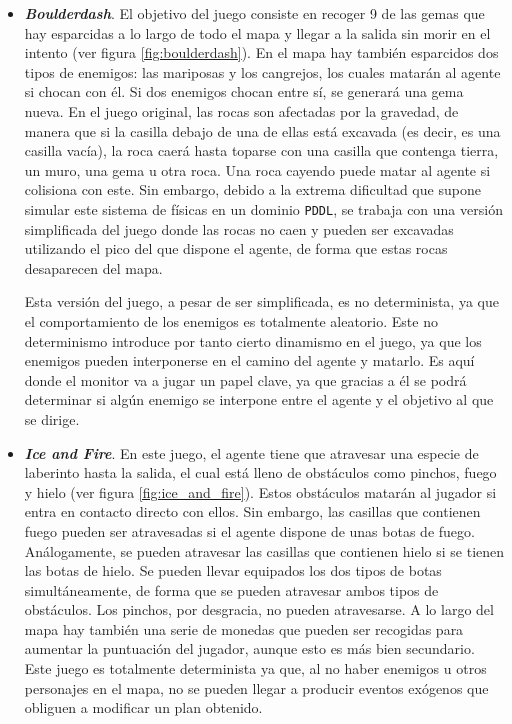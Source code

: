\begin{itemize}[label=\textbullet]
    \item \textbf{\textit{Boulderdash}}. El objetivo del juego consiste en recoger 9 de
    las gemas que hay esparcidas a lo largo de todo el mapa y llegar a la salida
    sin morir en el intento (ver figura \ref{fig:boulderdash}). En el mapa hay también
    esparcidos dos tipos de enemigos: las mariposas y los cangrejos, los cuales matarán al agente
    si chocan con él. Si dos enemigos chocan entre sí, se generará una gema nueva. En el
    juego original, las rocas son afectadas por la gravedad, de manera que si la casilla debajo de una
    de ellas está excavada (es decir, es una casilla vacía), la roca caerá hasta toparse
    con una casilla que contenga tierra, un muro, una gema u otra roca. Una roca cayendo puede matar
    al agente si colisiona con este. Sin embargo, debido a la extrema dificultad que supone
    simular este sistema de físicas en un dominio \texttt{PDDL}, se trabaja con una versión
    simplificada del juego donde las rocas no caen y pueden ser excavadas utilizando el pico
    del que dispone el agente, de forma que estas rocas desaparecen del mapa.
    
    Esta versión del juego, a pesar de ser simplificada, es no determinista, ya que el
    comportamiento de los enemigos es totalmente aleatorio. Este no determinismo introduce
    por tanto cierto dinamismo en el juego, ya que los enemigos pueden interponerse en el
    camino del agente y matarlo. Es aquí donde el monitor va a jugar un papel clave,
    ya que gracias a él se podrá determinar si algún enemigo se interpone entre el agente
    y el objetivo al que se dirige.
    
    \item \textbf{\textit{Ice and Fire}}. En este juego, el agente tiene que atravesar una especie
    de laberinto hasta la salida, el cual está lleno de obstáculos como pinchos, fuego y hielo
    (ver figura \ref{fig:ice_and_fire}). Estos obstáculos matarán al jugador si entra en contacto
    directo con ellos. Sin embargo, las casillas que contienen fuego pueden ser atravesadas si el
    agente dispone de unas botas de fuego. Análogamente, se pueden atravesar las casillas que
    contienen hielo si se tienen las botas de hielo. Se pueden llevar equipados los dos tipos
    de botas simultáneamente, de forma que se pueden atravesar ambos tipos de obstáculos. Los
    pinchos, por desgracia, no pueden atravesarse. A lo largo del mapa hay también una serie
    de monedas que pueden ser recogidas para aumentar la puntuación del jugador, aunque esto es más
    bien secundario. Este juego es totalmente determinista ya que, al no haber enemigos u otros
    personajes en el mapa, no se pueden llegar a producir eventos exógenos que obliguen a modificar
    un plan obtenido.
    

\end{itemize}
